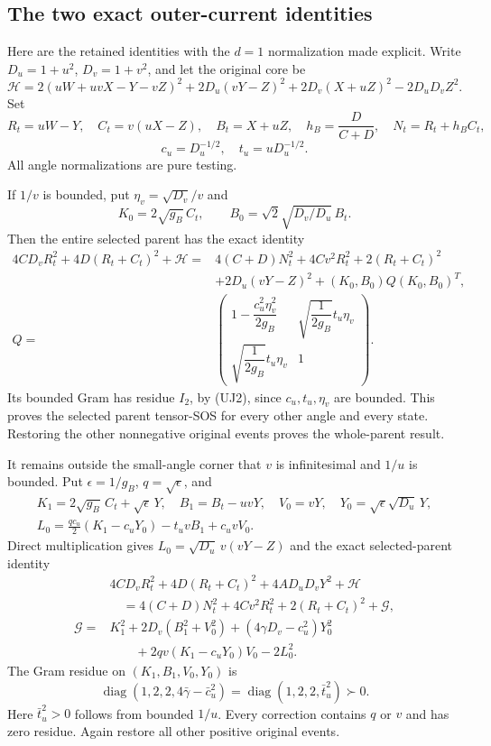 \subsection{The two exact outer-current identities}

Here are the retained identities with the $d=1$ normalization made
explicit. Write $D_u=1+u^2$, $D_v=1+v^2$, and let the original core be
\[
 \mathcal H=
 2(uW+uvX-Y-vZ)^2+2D_u(vY-Z)^2
 +2D_v(X+uZ)^2-2D_uD_vZ^2.
\]
Set
\[
 R_t=uW-Y,\quad C_t=v(uX-Z),\quad B_t=X+uZ,
 \quad h_B=\frac D{C+D},\quad N_t=R_t+h_BC_t,
\]
\[
 c_u=D_u^{-1/2},\quad t_u=uD_u^{-1/2}.
\]
All angle normalizations are pure testing.

If $1/v$ is bounded, put $\eta_v=\sqrt{D_v}/v$ and
\[
 K_0=2\sqrt{g_B}\,C_t,\qquad
 B_0=\sqrt2\sqrt{D_v/D_u}\,B_t.
\]
Then the entire selected parent has the exact identity
\[
\begin{split}
 4CD_vR_t^2+4D(R_t+C_t)^2+\mathcal H
 ={}&4(C+D)N_t^2+4Cv^2R_t^2+2(R_t+C_t)^2\\
 &+2D_u(vY-Z)^2+(K_0,B_0)Q(K_0,B_0)^T,\\
 Q={}&
 \begin{pmatrix}
 1-\dfrac{c_u^2\eta_v^2}{2g_B}&
          \sqrt{\dfrac1{2g_B}}t_u\eta_v\\
 \sqrt{\dfrac1{2g_B}}t_u\eta_v&1
 \end{pmatrix}.
\end{split}                                                     \tag{UJ3}
\]
Its bounded Gram has residue $I_2$, by (UJ2), since
$c_u,t_u,\eta_v$ are bounded. This proves the selected parent
tensor-SOS for every other angle and every state. Restoring the
other nonnegative original events proves the whole-parent result.

It remains outside the small-angle corner that $v$ is infinitesimal
and $1/u$ is bounded. Put $\epsilon=1/g_B$, $q=\sqrt\epsilon$, and
\[
\begin{gathered}
 K_1=2\sqrt{g_B}\,C_t+\sqrt\epsilon\,Y,\quad
 B_1=B_t-uvY,\quad V_0=vY,\quad
 Y_0=\sqrt\epsilon\sqrt{D_u}\,Y,\\
 L_0=\frac{qc_u}{2}(K_1-c_uY_0)-t_uvB_1+c_uvV_0.
\end{gathered}
\]
Direct multiplication gives
$L_0=\sqrt{D_u}\,v(vY-Z)$ and the exact selected-parent identity
\[
\begin{split}
 &4CD_vR_t^2+4D(R_t+C_t)^2+4AD_uD_vY^2+\mathcal H\\
 &\quad=4(C+D)N_t^2+4Cv^2R_t^2+2(R_t+C_t)^2+\mathcal G,\\
 \mathcal G={}&K_1^2+2D_v(B_1^2+V_0^2)
 +(4\gamma D_v-c_u^2)Y_0^2\\
 &\qquad+2qv(K_1-c_uY_0)V_0-2L_0^2.
\end{split}                                                     \tag{UJ4}
\]
The Gram residue on $(K_1,B_1,V_0,Y_0)$ is
\[
        \operatorname{diag}(1,2,2,4\bar\gamma-\bar c_u^2)
        =\operatorname{diag}(1,2,2,\bar t_u^2)\succ0.
\]
Here $\bar t_u^2>0$ follows from bounded $1/u$. Every correction
contains $q$ or $v$ and has zero residue. Again restore all other
positive original events.

